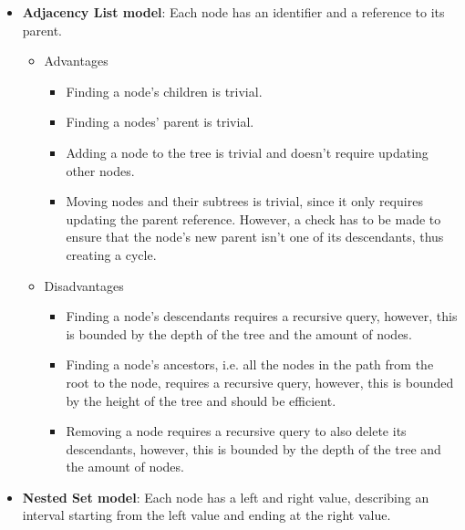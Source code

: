 %
\begin{itemize}
  \item \textbf{Adjacency List model}: Each node has an identifier and a reference to its parent.
    \begin{itemize}
      \item Advantages
        \begin{itemize}
        \item Finding a node's children is trivial.
        \item Finding a nodes' parent is trivial.
        \item Adding a node to the tree is trivial and doesn't require updating other
          nodes. 
        \item Moving nodes and their subtrees is trivial, since it only requires updating
          the parent reference. However, a check has to be made to ensure that the node's
            new parent isn't one of its descendants, thus creating a cycle.
        \end{itemize}
      \item Disadvantages
        \begin{itemize}
        \item Finding a node's descendants requires a recursive query, however,
          this is bounded by the depth of the tree and the amount of nodes.
        \item Finding a node's ancestors, i.e. all the nodes in the path from the root to
          the node, requires a recursive query, however, this is bounded by the height of
            the tree and should be efficient.
        \item Removing a node requires a recursive query to also delete its descendants,
          however, this is bounded by the depth of
            the tree and the amount of nodes.
      \end{itemize}
    \end{itemize}
  \item \textbf{Nested Set model}: Each node has a left and right value, describing an
    interval starting from the left value and ending at the right value.

\end{itemize}
